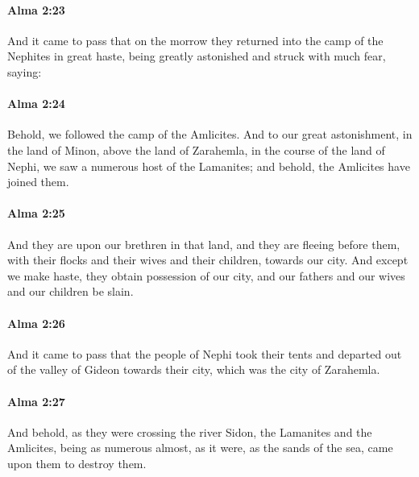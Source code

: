 		\paragraph{Alma 2:23} %
			\label{ALMA-2-23}

			And it came to pass that on the morrow
			they returned into the camp of the Nephites in great haste,
			being greatly astonished and struck with much fear, saying:

		\paragraph{Alma 2:24} %
			\label{ALMA-2-24}

			Behold, we followed the camp of the Amlicites.
			And to our great astonishment,
			in the land of Minon, above the land of Zarahemla,
			in the course of the land of Nephi,
			we saw a numerous host of the Lamanites;
			and behold, the Amlicites have joined them.

		\paragraph{Alma 2:25} %
			\label{ALMA-2-25}

			And they are upon our brethren in that land,
			and they are fleeing before them,
			with their flocks and their wives and their children,
			towards our city.
			And except we make haste,
			they obtain possession of our city,
			and our fathers and our wives and our children be slain.

		\paragraph{Alma 2:26} %
			\label{ALMA-2-26}

			And it came to pass that the people of Nephi took their tents
			and departed out of the valley of Gideon
			towards their city, which was the city of Zarahemla.

		\paragraph{Alma 2:27} %
			\label{ALMA-2-27}

			And behold, as they were crossing the river Sidon,
			the Lamanites and the Amlicites,
			being as numerous almost, as it were, as the sands of the sea,
			came upon them to destroy them.

